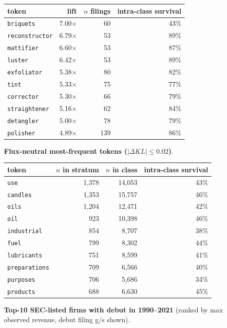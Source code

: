 \begin{tabular}{lrrr}
\toprule
token & lift & $n$ filings & intra-class survival \\
\midrule
\texttt{briquets} & 7.00$\times$ & 60 & 43\% \\
\texttt{reconstructor} & 6.79$\times$ & 53 & 89\% \\
\texttt{mattifier} & 6.60$\times$ & 53 & 87\% \\
\texttt{luster} & 6.42$\times$ & 53 & 89\% \\
\texttt{exfoliator} & 5.38$\times$ & 80 & 82\% \\
\texttt{tint} & 5.33$\times$ & 75 & 77\% \\
\texttt{corrector} & 5.30$\times$ & 66 & 79\% \\
\texttt{straightener} & 5.16$\times$ & 62 & 84\% \\
\texttt{detangler} & 5.00$\times$ & 78 & 79\% \\
\texttt{polisher} & 4.89$\times$ & 139 & 86\% \\
\bottomrule
\end{tabular}

\textbf{Flux-neutral most-frequent tokens ($|\Delta KL|\leq 0.02$)}.

\begin{tabular}{lrrr}
\toprule
token & $n$ in stratum & $n$ in class & intra-class survival \\
\midrule
\texttt{use} & 1,378 & 14,053 & 43\% \\
\texttt{candles} & 1,353 & 15,757 & 46\% \\
\texttt{oils} & 1,204 & 12,471 & 42\% \\
\texttt{oil} & 923 & 10,398 & 46\% \\
\texttt{industrial} & 854 & 8,707 & 38\% \\
\texttt{fuel} & 799 & 8,302 & 44\% \\
\texttt{lubricants} & 751 & 8,599 & 41\% \\
\texttt{preparations} & 709 & 6,566 & 40\% \\
\texttt{purposes} & 706 & 5,686 & 34\% \\
\texttt{products} & 688 & 6,630 & 45\% \\
\bottomrule
\end{tabular}

\textbf{Top-10 SEC-listed firms with debut in 1990--2021} (ranked by max observed revenue, debut filing g/s shown).

